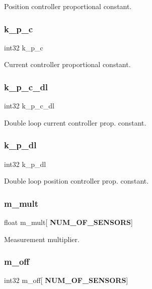 Position controller proportional constant. \mbox{\label{structst__mem_ac3311db4a733f35aa5ed2672cb162f96}} 
\subsubsection{k\+\_\+p\+\_\+c}
{\footnotesize\ttfamily int32 k\+\_\+p\+\_\+c}

Current controller proportional constant. \mbox{\label{structst__mem_a63c3f3c01d6757cafdb40043adce404e}} 
\subsubsection{k\+\_\+p\+\_\+c\+\_\+dl}
{\footnotesize\ttfamily int32 k\+\_\+p\+\_\+c\+\_\+dl}

Double loop current controller prop. constant. \mbox{\label{structst__mem_a047226f308f4365d9d0036d71b6ed910}} 
\subsubsection{k\+\_\+p\+\_\+dl}
{\footnotesize\ttfamily int32 k\+\_\+p\+\_\+dl}

Double loop position controller prop. constant. \mbox{\label{structst__mem_aecf0baab567443534c0ded663b746896}} 
\subsubsection{m\+\_\+mult}
{\footnotesize\ttfamily float m\+\_\+mult[\textbf{ N\+U\+M\+\_\+\+O\+F\+\_\+\+S\+E\+N\+S\+O\+RS}]}

Measurement multiplier. \mbox{\label{structst__mem_ab544f035124be893918bafb611fe88d9}} 
\subsubsection{m\+\_\+off}
{\footnotesize\ttfamily int32 m\+\_\+off[\textbf{ N\+U\+M\+\_\+\+O\+F\+\_\+\+S\+E\+N\+S\+O\+RS}]}

